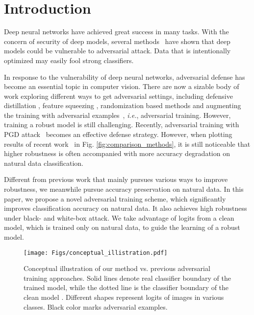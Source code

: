 \documentclass[final]{cvpr}
\begin{document}
\section{Introduction}
Deep neural networks have achieved great success in many tasks. With the concern of security of deep models, several methods~\cite{DBLP:conf/cvpr/DongLPS0HL18,Xie_2019_CVPR,DBLP:journals/corr/SzegedyZSBEGF13,Shi_2019_CVPR,DBLP:conf/iclr/TramerKPGBM18,DBLP:conf/aaai/ZhengC019,DBLP:conf/iclr/TramerKPGBM18,DBLP:conf/cvpr/HeZRS16,DBLP:conf/cvpr/HuangLMW17,DBLP:journals/corr/SimonyanZ14a} have shown that deep models could be vulnerable to adversarial attack. Data that is intentionally optimized may easily fool strong classifiers. 

In response to the vulnerability of deep neural networks, adversarial defense has become an essential topic in computer vision. There are now a sizable body of work exploring different ways to get adversarial settings, including defensive distillation \cite{DBLP:conf/sp/PapernotM0JS16}, feature squeezing \cite{DBLP:conf/ndss/Xu0Q18}, randomization based methods \cite{DBLP:conf/iclr/XieWZRY18,DBLP:conf/iclr/DhillonALBKKA18} and augmenting the training with adversarial examples~\cite{zhang2019theoretically,DBLP:journals/corr/abs-1803-06373,DBLP:conf/iclr/MadryMSTV18,DBLP:conf/iclr/TramerKPGBM18}, {\it i.e.}, adversarial training. However, training a robust model is still challenging. Recently, adversarial training with PGD attack~\cite{DBLP:conf/iclr/MadryMSTV18} becomes an effective defense strategy. However, when plotting results of recent work~\cite{zhang2019theoretically,DBLP:journals/corr/abs-1803-06373,DBLP:conf/iclr/MadryMSTV18} in Fig. \ref{fig:comparison_methods}, it is still noticeable that higher robustness is often accompanied with more accuracy degradation on natural data classification. 

Different from previous work that mainly pursues various ways to improve robustness, we meanwhile pursue accuracy preservation on natural data.
In this paper, we propose a novel adversarial training scheme, which significantly improves classification accuracy on natural data. It also achieves high robustness under black- and white-box attack. We take advantage of logits from a clean model, which is trained only on natural data, to guide the learning of a robust model. 

\begin{figure*}[t]
	\begin{center}
		\texttt{[image: Figs/conceptual\_illistration.pdf]}
		\caption{Conceptual illustration of our method vs. previous adversarial training approaches. Solid lines denote real classifier boundary of the trained model, while the dotted line is the classifier boundary of the clean model . Different shapes represent logits of images in various classes. Black color marks adversarial examples.} 
		\label{fig:illustration}
	\end{center}
    \vspace{-0.1in}
\end{figure*}
\end{document}
